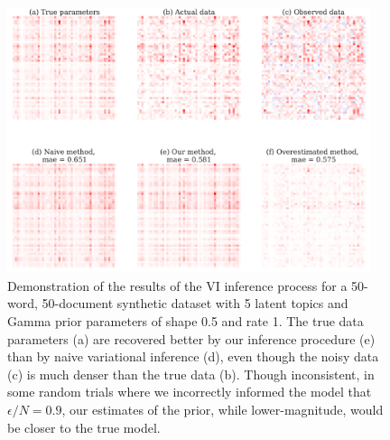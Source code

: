 \documentclass[letterpaper]{article}
\newcommand{\Yten}{\pmb{Y}}
\begin{document}
  \begin{figure}[t]
    \centering
    \includegraphics[width=0.95\textwidth]{figures/test_output.pdf}
    \caption{Demonstration of the results of the VI inference process for a
     50-word, 50-document synthetic dataset with 5 latent topics and Gamma prior
     parameters of shape 0.5 and rate 1. The true data parameters (a) are
     recovered better by our inference procedure (e) than by naive variational
     inference (d), even though the noisy data (c) is much denser than the true
     data (b). Though inconsistent, in some random trials where we incorrectly
     informed the model that $\epsilon / N = 0.9$, our estimates of the prior,
     while lower-magnitude, would be closer to the true model.}
    \label{fig:test_output}
\end{figure}
  
  
\end{document}
